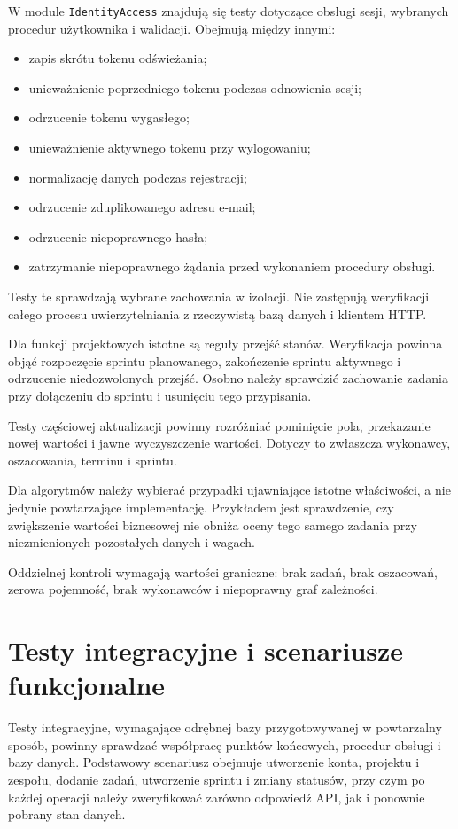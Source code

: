 W module \texttt{IdentityAccess} znajdują się testy dotyczące obsługi sesji, wybranych procedur użytkownika i walidacji. Obejmują między innymi:

\begin{itemize}
    \item zapis skrótu tokenu odświeżania;
    \item unieważnienie poprzedniego tokenu podczas odnowienia sesji;
    \item odrzucenie tokenu wygasłego;
    \item unieważnienie aktywnego tokenu przy wylogowaniu;
    \item normalizację danych podczas rejestracji;
    \item odrzucenie zduplikowanego adresu e-mail;
    \item odrzucenie niepoprawnego hasła;
    \item zatrzymanie niepoprawnego żądania przed wykonaniem procedury obsługi.
\end{itemize}

Testy te sprawdzają wybrane zachowania w izolacji. Nie zastępują weryfikacji całego procesu uwierzytelniania z rzeczywistą bazą danych i klientem HTTP.

Dla funkcji projektowych istotne są reguły przejść stanów. Weryfikacja powinna objąć rozpoczęcie sprintu planowanego, zakończenie sprintu aktywnego i odrzucenie niedozwolonych przejść. Osobno należy sprawdzić zachowanie zadania przy dołączeniu do sprintu i usunięciu tego przypisania.

Testy częściowej aktualizacji powinny rozróżniać pominięcie pola, przekazanie nowej wartości i jawne wyczyszczenie wartości. Dotyczy to zwłaszcza wykonawcy, oszacowania, terminu i sprintu.

Dla algorytmów należy wybierać przypadki ujawniające istotne właściwości, a nie jedynie powtarzające implementację. Przykładem jest sprawdzenie, czy zwiększenie wartości biznesowej nie obniża oceny tego samego zadania przy niezmienionych pozostałych danych i wagach.

Oddzielnej kontroli wymagają wartości graniczne: brak zadań, brak oszacowań, zerowa pojemność, brak wykonawców i niepoprawny graf zależności.

\section{Testy integracyjne i scenariusze funkcjonalne}

Testy integracyjne, wymagające odrębnej bazy przygotowywanej w powtarzalny sposób, powinny sprawdzać współpracę punktów końcowych, procedur obsługi i bazy danych. Podstawowy scenariusz obejmuje utworzenie konta, projektu i zespołu, dodanie zadań, utworzenie sprintu i zmiany statusów, przy czym po każdej operacji należy zweryfikować zarówno odpowiedź API, jak i ponownie pobrany stan danych.

